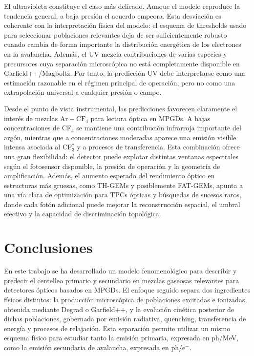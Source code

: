 \documentclass[12pt,a4paper]{article}
\newcommand{\Ar}{\mathrm{Ar}}
\newcommand{\CF}{\mathrm{CF}}
\begin{document}
El ultravioleta constituye el caso más delicado. Aunque el modelo reproduce la tendencia general, a baja presión el acuerdo empeora. Esta desviación es coherente con la interpretación física del modelo: el esquema de thresholds usado para seleccionar poblaciones relevantes deja de ser suficientemente robusto cuando cambia de forma importante la distribución energética de los electrones en la avalancha. Además, el UV mezcla contribuciones de varias especies y precursores cuya separación microscópica no está completamente disponible en Garfield++/Magboltz. Por tanto, la predicción UV debe interpretarse como una estimación razonable en el régimen principal de operación, pero no como una extrapolación universal a cualquier presión o campo.

Desde el punto de vista instrumental, las predicciones favorecen claramente el interés de mezclas $\Ar-\CF_4$ para lectura óptica en MPGDs. A bajas concentraciones de CF$_4$ se mantiene una contribución infrarroja importante del argón, mientras que a concentraciones moderadas aparece una emisión visible intensa asociada al CF$_3^*$ y a procesos de transferencia. Esta combinación ofrece una gran flexibilidad: el detector puede explotar distintas ventanas espectrales según el fotosensor disponible, la presión de operación y la geometría de amplificación. Además, el aumento esperado del rendimiento óptico en estructuras más gruesas, como TH-GEMs y posiblemente FAT-GEMs, apunta a una vía clara de optimización para TPCs ópticas y búsquedas de sucesos raros, donde cada fotón adicional puede mejorar la reconstrucción espacial, el umbral efectivo y la capacidad de discriminación topológica.

\section{Conclusiones}

En este trabajo se ha desarrollado un modelo fenomenológico para describir y predecir el centelleo primario y secundario en mezclas gaseosas relevantes para detectores ópticos basados en MPGDs. El enfoque seguido separa dos ingredientes físicos distintos: la producción microscópica de poblaciones excitadas e ionizadas, obtenida mediante Degrad o Garfield++, y la evolución cinética posterior de dichas poblaciones, gobernada por emisión radiativa, quenching, transferencia de energía y procesos de relajación. Esta separación permite utilizar un mismo esquema físico para estudiar tanto la emisión primaria, expresada en ph/MeV, como la emisión secundaria de avalancha, expresada en ph/e$^-$.
\end{document}
